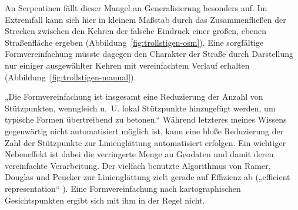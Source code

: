 \documentclass[../main/thesis.tex]{subfiles}
\begin{document}

An Serpentinen fällt dieser Mangel an Generalisierung besonders auf.
Im Extremfall kann sich hier in kleinem Maßstab durch das Zusammenfließen der Strecken zwischen den Kehren der falsche Eindruck einer großen, ebenen Straßenfläche ergeben (Abbildung~\ref{fig:trollstigen-osm}).
Eine sorgfältige Formvereinfachung müsste dagegen den Charakter der Straße durch Darstellung nur einiger ausgewählter Kehren mit vereinfachtem Verlauf erhalten (Abbildung~\ref{fig:trollstigen-manual}).

„Die Formvereinfachung ist insgesamt eine Reduzierung der Anzahl von Stützpunkten, wenngleich u.~U. lokal Stützpunkte hinzugefügt werden, um typische Formen übertreibend zu betonen.“ 
Während letzteres meines Wissens gegenwärtig nicht automatisiert möglich ist, kann eine bloße Reduzierung der Zahl der Stützpunkte zur Linienglättung automatisiert erfolgen.
Ein wichtiger Nebeneffekt ist dabei die verringerte Menge an Geodaten und damit deren vereinfachte Verarbeitung.
Der vielfach benutzte Algorithmus von Ramer, Douglas und Peucker zur Linienglättung zielt gerade auf Effizienz ab („efficient representation“ ).
Eine Formvereinfachung nach kartographischen Gesichtspunkten ergibt sich mit ihm in der Regel nicht.
\end{document}
